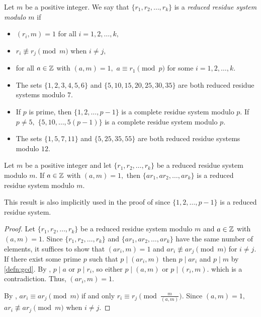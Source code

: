 \documentclass{ximera}
\begin{document}
\begin{defn}\label{defn:reduced-res-sys}
    Let $m$ be a positive integer. We say that $\{r_1,r_2,\dots,r_k\}$ is a \emph{reduced residue system modulo $m$} if 
    \begin{itemize}
        \item $(r_i,m)=1$ for all $i=1,2,\dots,k,$
        \item $r_i\not \equiv r_j \pmod {m}$ when $i\neq j,$
        \item for all $a\in\mathbb Z$ with $(a,m)=1,$ $a\equiv r_1\pmod{p}$ for some $i=1,2,\dots,k.$ 
    \end{itemize}
\end{defn}

\begin{example}\label{example:reduced-sys}
    
    \begin{itemize}
        \item The sets $\{1,2,3,4,5,6\}$ and $\{5,10,15,20,25,30,35\}$ are both reduced residue systems modulo $7.$
        
        \item If $p$ is prime, then $\{1,2,\dots,p-1\}$ is a complete residue system modulo $p.$ If $p\neq 5,$ $\{5,10,\dots, 5(p-1)\}$ is a complete residue system modulo $p.$
        
        \item The sets $\{1,5,7,11\}$ and $\{5,25,35,55\}$ are both reduced residue systems modulo $12.$
    \end{itemize}
\end{example}


\begin{lemma}\label{lem:reduced-sys}
    Let $m$ be a positive integer and let $\{r_1,r_2,\dots,r_k\}$ be a reduced residue system modulo $m.$ If $a\in\mathbb Z$ with $(a,m)=1,$ then $\{ar_1,ar_2,\dots,ar_k\}$ is a reduced residue system modulo $m.$
\end{lemma}
This result is also implicitly used in the proof of  since $\{1,2,\dots,p-1\}$ is a reduced residue system.

\begin{proof}
    Let $\{r_1,r_2,\dots,r_k\}$ be a reduced residue system modulo $m$ and $a\in\mathbb Z$ with $(a,m)=1.$ Since $\{r_1,r_2,\dots,r_k\}$ and $\{ar_1,ar_2,\dots,ar_k\}$ have the same number of elements, it suffices to show that $(ar_i,m)=1$ and  $ar_i\not\equiv ar_j\pmod{m}$ for $i\neq j.$ If there exist some prime $p$ such that $p\mid(ar_i,m)$ then $p\mid ar_i$ and $p\mid m$ by \autoref{defn:gcd}. By , $p\mid a$ or $p\mid r_i$, so either $p\mid (a,m)$ or $p\mid (r_i,m).$ which is a contradiction. Thus, $(ar_i,m)=1.$

    By , $ar_i\equiv ar_j\pmod{m}$ if and only $r_i\equiv r_j \pmod{\tfrac{m}{(a,m)}}.$ Since $(a,m)=1,$ $ar_i\not\equiv ar_j\pmod{m}$ when $i\neq j$.
\end{proof}
\end{document}
